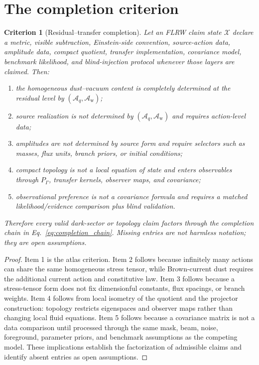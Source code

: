 \documentclass[
  aps,
  prd,
  reprint,
  superscriptaddress,
  floatfix,
  nofootinbib,
  longbibliography
]{revtex4-2}
\theoremstyle{plain}
\newtheorem{criterion}[theorem]{Criterion}
\theoremstyle{definition}
\theoremstyle{remark}
\newcommand{\Aq}{\mathcal A_q}
\newcommand{\Aw}{\mathcal A_{\mathrm w}}
\newcommand{\PG}{P_{\Gamma}}
\newcommand{\Xcal}{\mathcal X}
\begin{document}
\section{The completion criterion}

\begin{criterion}[Residual--transfer completion]
Let an FLRW claim state $\Xcal$ declare a metric, visible subtraction, Einstein-side convention, source-action data, amplitude data, compact quotient, transfer implementation, covariance model, benchmark likelihood, and blind-injection protocol whenever those layers are claimed.  Then:
\begin{enumerate}
\item the homogeneous dust--vacuum content is completely determined at the residual level by $(\Aq,\Aw)$;
\item source realization is not determined by $(\Aq,\Aw)$ and requires action-level data;
\item amplitudes are not determined by source form and require selectors such as masses, flux units, branch priors, or initial conditions;
\item compact topology is not a local equation of state and enters observables through $\PG$, transfer kernels, observer maps, and covariance;
\item observational preference is not a covariance formula and requires a matched likelihood/evidence comparison plus blind validation.
\end{enumerate}
Therefore every valid dark-sector or topology claim factors through the completion chain in Eq.~\eqref{eq:completion_chain}.  Missing entries are not harmless notation; they are open assumptions.
\end{criterion}

\begin{proof}
Item 1 is the atlas criterion.  Item 2 follows because infinitely many actions can share the same homogeneous stress tensor, while Brown-current dust requires the additional current action and constitutive law.  Item 3 follows because a stress-tensor form does not fix dimensionful constants, flux spacings, or branch weights.  Item 4 follows from local isometry of the quotient and the projector construction: topology restricts eigenspaces and observer maps rather than changing local fluid equations.  Item 5 follows because a covariance matrix is not a data comparison until processed through the same mask, beam, noise, foreground, parameter priors, and benchmark assumptions as the competing model.  These implications establish the factorization of admissible claims and identify absent entries as open assumptions.
\end{proof}
\end{document}
